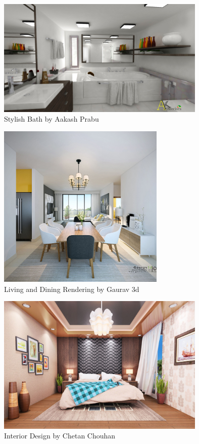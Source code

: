 \begin{figure}
	\centering
		\includegraphics[width=10cm]{img/bath1.jpg}
	\caption{Stylish Bath by Aakash Prabu}
	\label{fig:3}
\end{figure}


\begin{figure}
	\centering
		\includegraphics[width=8cm]{img/8_large.jpg}
	\caption{Living and Dining Rendering by Gaurav 3d}
	\label{fig:4}
\end{figure}



\begin{figure}
	\centering
		\includegraphics[width=10cm]{img/bedroom.jpg}
	\caption{Interior Design by Chetan Chouhan}
	\label{fig:5}
\end{figure}



